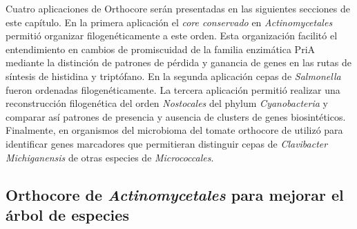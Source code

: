\documentclass[12pt,twoside]{reedthesis}
\begin{document}
  Cuatro aplicaciones de Orthocore serán presentadas en las siguientes
  secciones de este capítulo. En la primera aplicación el \emph{core
  conservado} en \emph{Actinomycetales} permitió organizar
  filogenéticamente a este orden. Esta organización facilitó el
  entendimiento en cambios de promiscuidad de la familia enzimática PriA
  mediante la distinción de patrones de pérdida y ganancia de genes en las
  rutas de síntesis de histidina y triptófano. En la segunda aplicación
  cepas de \emph{Salmonella} fueron ordenadas filogenéticamente. La
  tercera aplicación permitió realizar una reconstrucción filogenética del
  orden \emph{Nostocales} del phylum \emph{Cyanobacteria} y comparar así
  patrones de presencia y ausencia de clusters de genes biosintéticos.
  Finalmente, en organismos del microbioma del tomate orthocore de utilizó
  para identificar genes marcadores que permitieran distinguir cepas de
  \emph{Clavibacter Michiganensis} de otras especies de
  \emph{Micrococcales}.
  
  \subsection{\texorpdfstring{Orthocore de \emph{Actinomycetales} para
  mejorar el árbol de
  especies}{Orthocore de Actinomycetales para mejorar el árbol de especies}}\label{orthocore-de-actinomycetales-para-mejorar-el-arbol-de-especies}
  
\end{document}
